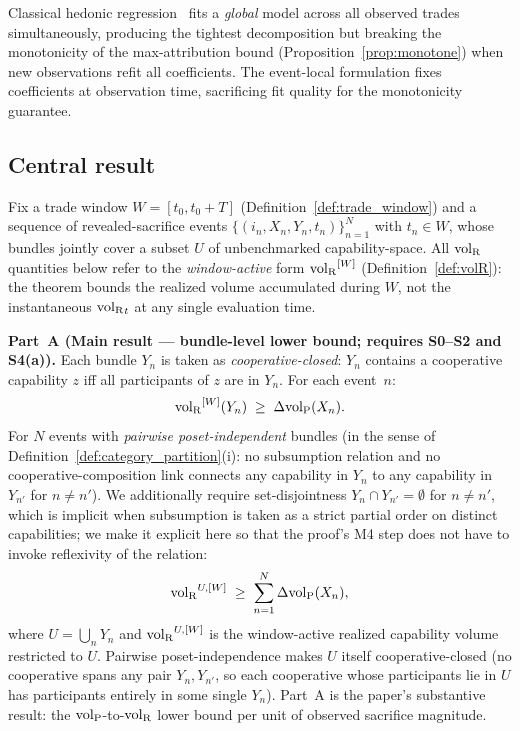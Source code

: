\begin{remark}
Classical hedonic regression~\citep{rosen1974hedonic} fits a
\emph{global} model across all observed trades simultaneously,
producing the tightest decomposition but breaking the monotonicity
of the max-attribution bound
(Proposition~\ref{prop:monotone}) when new observations refit all
coefficients.  The event-local formulation fixes coefficients at
observation time, sacrificing fit quality for the monotonicity
guarantee.
\end{remark}

\subsection{Central result}

\begin{theorem}
\label{thm:aggregate_bound}
Fix a trade window $W = [t_0, t_0 + T]$
(Definition~\ref{def:trade_window}) and a sequence of
revealed-sacrifice events
$\{(i_n, X_n, Y_n, t_n)\}_{n=1}^N$ with $t_n \in W$, whose
bundles jointly cover a subset $U$ of unbenchmarked
capability-space.  All ${\operatorname{vol}_{\mathrm{R}}}$ quantities below refer to the
\emph{window-active} form ${\operatorname{vol}_{\mathrm{R}}}^{[W]}$
(Definition~\ref{def:volR}): the theorem bounds the realized
volume accumulated during $W$, not the instantaneous
${\operatorname{vol}_{\mathrm{R}}}_t$ at any single evaluation time.

\medskip\noindent
\textbf{Part~A (Main result --- bundle-level lower bound;
requires S0--S2 and S4(a)).}
Each bundle $Y_n$ is taken as \emph{cooperative-closed}: $Y_n$
contains a cooperative capability $z$ iff all participants of
$z$ are in $Y_n$.  For each event~$n$:
\[
  {\operatorname{vol}_{\mathrm{R}}}^{[W]}(Y_n) \;\geq\; \Delta{\operatorname{vol}_{\mathrm{P}}}(X_n).
\]
For $N$ events with \emph{pairwise poset-independent} bundles
(in the sense of
Definition~\ref{def:category_partition}(i): no subsumption
relation and no cooperative-composition link connects any
capability in $Y_n$ to any capability in $Y_{n'}$ for
$n \neq n'$).  We additionally require set-disjointness
$Y_n \cap Y_{n'} = \emptyset$ for $n \neq n'$, which is
implicit when subsumption is taken as a strict partial order
on distinct capabilities; we make it explicit here so that
the proof's M4 step does not have to invoke reflexivity of the
relation:
\[
  {\operatorname{vol}_{\mathrm{R}}}^{U,[W]} \;\geq\; \sum_{n=1}^{N} \Delta{\operatorname{vol}_{\mathrm{P}}}(X_n),
\]
where $U = \bigcup_n Y_n$ and ${\operatorname{vol}_{\mathrm{R}}}^{U,[W]}$ is the
window-active realized capability volume restricted to $U$.
Pairwise poset-independence makes $U$ itself
cooperative-closed (no cooperative spans any pair $Y_n, Y_{n'}$,
so each cooperative whose participants lie in $U$ has
participants entirely in some single $Y_n$).  Part~A is the paper's
substantive result: the ${\operatorname{vol}_{\mathrm{P}}}$-to-${\operatorname{vol}_{\mathrm{R}}}$ lower bound per unit
of observed sacrifice magnitude.


\end{theorem}
